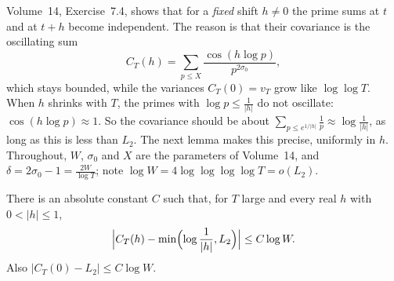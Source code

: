 Volume~14, Exercise~7.4, shows that for a \emph{fixed} shift $h\ne0$ the prime sums at $t$ and at $t+h$ become independent. The reason is that their covariance is the oscillating sum
\[
C_T(h)=\sum_{p\le X}\frac{\cos(h\log p)}{p^{2\sigma_0}},
\]
which stays bounded, while the variances $C_T(0)=v_T$ grow like $\log\log T$. When $h$ shrinks with $T$, the primes with $\log p\le\frac1{|h|}$ do not oscillate: $\cos(h\log p)\approx1$. So the covariance should be about $\sum_{p\le e^{1/|h|}}\frac1p\approx\log\frac1{|h|}$, as long as this is less than $L_2$. The next lemma makes this precise, uniformly in $h$. Throughout, $W$, $\sigma_0$ and $X$ are the parameters of Volume~14, and $\delta=2\sigma_0-1=\frac{2W}{\log T}$; note $\log W=4\log\log\log\log T=o(L_2)$.

\begin{lemma}\label{lem:covariance}
There is an absolute constant $C$ such that, for $T$ large and every real $h$ with $0<|h|\le1$,
\[
\Bigl|C_T(h)-\min\Bigl(\log\frac1{|h|},L_2\Bigr)\Bigr|\le C\log W .
\]
Also $|C_T(0)-L_2|\le C\log W$.
\end{lemma}

